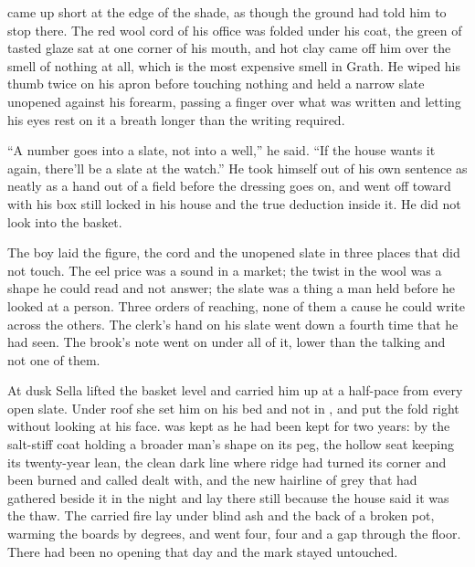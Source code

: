  came up short at the edge of the shade, as though the ground had told him to stop there. The red wool cord of his office was folded under his coat, the green of tasted glaze sat at one corner of his mouth, and hot clay came off him over the smell of nothing at all, which is the most expensive smell in Grath. He wiped his thumb twice on his apron before touching nothing and held a narrow slate unopened against his forearm, passing a finger over what was written and letting his eyes rest on it a breath longer than the writing required.

“A number goes into a slate, not into a well,” he said. “If the house wants it again, there'll be a slate at the watch.” He took himself out of his own sentence as neatly as a hand out of a field before the dressing goes on, and went off toward  with his box still locked in his house and the true deduction inside it. He did not look into the basket.

The boy laid the figure, the cord and the unopened slate in three places that did not touch. The eel price was a sound in a market; the twist in the wool was a shape he could read and not answer; the slate was a thing a man held before he looked at a person. Three orders of reaching, none of them a cause he could write across the others. The clerk's hand on his slate went down a fourth time that he had seen. The brook's note went on under all of it, lower than the talking and not one of them.

\scenebreak

At dusk Sella lifted the basket level and carried him up  at a half-pace from every open slate. Under  roof she set him on his bed and not in , and put the fold right without looking at his face.  was kept as he had been kept for two years: by the salt-stiff coat holding a broader man's shape on its peg, the hollow seat keeping its twenty-year lean, the clean dark line where  ridge had turned its corner and been burned and called dealt with, and the new hairline of grey that had gathered beside it in the night and lay there still because the house said it was the thaw. The carried fire lay under blind ash and the back of a broken pot, warming the boards by degrees, and  went four, four and a gap through the floor. There had been no opening that day and the mark stayed untouched.

